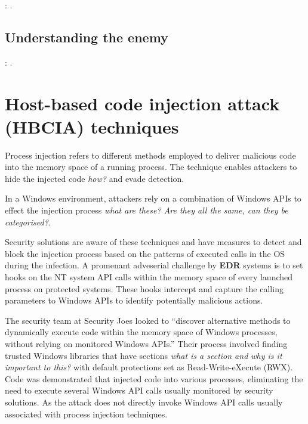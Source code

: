 \documentclass{article}
\begin{document}
\textbf{}: \textcite{CVE-2023-3519}.


\subsection{Understanding the enemy}

\textbf{}: \textcite{CISA:2023}.

\section{Host-based code injection attack (HBCIA) techniques}

Process injection refers to different methods employed to deliver malicious code into the memory space of a
running process.  The technique enables attackers to hide the injected code \textit{how?} and evade detection.

In a Windows \faWindows \space environment, attackers rely on a combination of Windows APIs to effect the injection
process \textit{what are these? Are they all the same, can they be categorised?}.

Security solutions are aware of these techniques and have measures to detect and block the injection process based
on the patterns of executed calls in the OS during the infection.  A promenant adveserial challenge by \textbf{EDR}
systems is to set hooks on the NT system API calls within the memory space of every launched process on protected
systems.  These hooks intercept and capture the calling parameters to Windows APIs to identify potentially malicious actions.

The security team at Security Joes looked to ``discover alternative methods to dynamically execute code within
the memory space of Windows processes, without relying on monitored Windows APIs.''  Their process involved
finding trusted Windows libraries that have sections \textit{what is a section and why is it important to this?}
with default protections set as Read-Write-eXecute (RWX).  Code was demonstrated that injected code into various
processes, eliminating the need to execute several Windows API calls usually monitored by security solutions.
As the attack does not directly invoke Windows API calls usually associated with process injection techniques.
\end{document}

